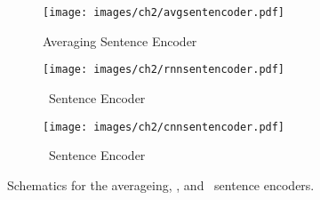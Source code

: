 \begin{figure}
\begin{subfigure}{\textwidth}
  \centering
  \texttt{[image: images/ch2/avgsentencoder.pdf]}
  \caption{Averaging Sentence Encoder}
  \label{fig:sfig1}
\end{subfigure}

\begin{subfigure}{\textwidth}
  \centering
  \texttt{[image: images/ch2/rnnsentencoder.pdf]}
  \caption{\RecurrentNeuralNetwork~Sentence Encoder}
  \label{fig:sfig2}
\end{subfigure}

\begin{subfigure}{\textwidth}
  \centering
  \texttt{[image: images/ch2/cnnsentencoder.pdf]}
  \caption{\convolutionalneuralnetwork~Sentence Encoder}
  \label{fig:sfig2}
\end{subfigure}
    \caption{Schematics for the averageing, \recurrentneuralnetwork,
    and \convolutionalneuralnetwork~sentence encoders.}
\label{fig:sentenceEncoders}
\end{figure}



